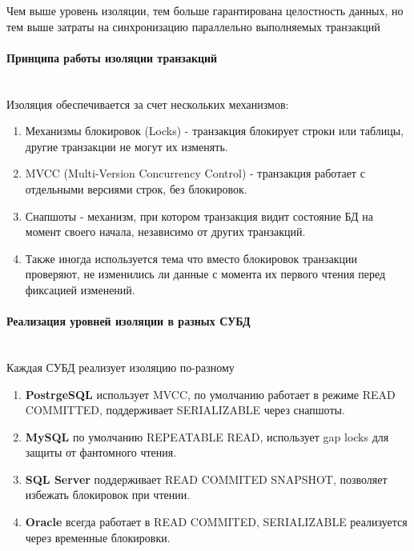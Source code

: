  Чем выше уровень изоляции, тем больше гарантирована целостность данных, но тем выше затраты на синхронизацию параллельно выполняемых транзакций

 \paragraph{Принципа работы изоляции транзакций} ~\\

 Изоляция обеспечивается за счет нескольких механизмов:
 \begin{enumerate}
     \item Механизмы блокировок (Locks) - транзакция блокирует строки или таблицы, другие транзакции не могут их изменять.
     \item MVCC (Multi-Version Concurrency Control) - транзакция работает с отдельными версиями строк, без блокировок.
     \item Снапшоты - механизм, при котором транзакция видит состояние БД на момент своего начала, независимо от других транзакций.
     \item Также иногда используется тема что вместо блокировок транзакции проверяют, не изменились ли данные с момента их первого чтения перед фиксацией изменений.
 \end{enumerate}
 
 \paragraph{Реализация уровней изоляции в разных СУБД} ~\\
 
 Каждая СУБД реализует изоляцию по-разному \autocites[§2]{PostgreSQLdocc13}[§17.7.2.1]{Mysqldoc4}{MicrosoftLearnSQLserverIsolation}{oracledbdoc5}
 
 \begin{enumerate}
     \item \textbf{PostrgeSQL} использует MVCC, по умолчанию работает в режиме READ COMMITTED, поддерживает SERIALIZABLE через снапшоты.
     \item \textbf{MySQL} по умолчанию REPEATABLE READ, использует gap locks для защиты от фантомного чтения.
     \item \textbf{SQL Server} поддерживает READ COMMITED SNAPSHOT, позволяет избежать блокировок при чтении.
     \item \textbf{Oracle} всегда работает в READ COMMITED, SERIALIZABLE реализуется через временные блокировки.
 \end{enumerate}
 
